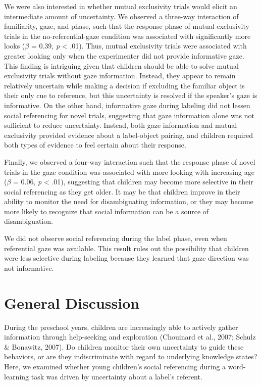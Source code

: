 \documentclass[10pt, letterpaper]{article}
\begin{document}
We were also interested in whether mutual exclusivity trials would
elicit an intermediate amount of uncertainty. We observed a three-way
interaction of familiarity, gaze, and phase, such that the response
phase of mutual exclusivity trials in the no-referential-gaze condition
was associated with significantly more looks (\(\beta\) = 0.39, \emph{p}
\textless{} .01). Thus, mutual exclusivity trials were associated with
greater looking only when the experimenter did not provide informative
gaze. This finding is intriguing given that children should be able to
solve mutual exclusivity trials without gaze information. Instead, they
appear to remain relatively uncertain while making a decision if
excluding the familiar object is their only cue to reference, but this
uncertainty is resolved if the speaker's gaze is informative. On the
other hand, informative gaze during labeling did not lessen social
referencing for novel trials, suggesting that gaze information alone was
not sufficient to reduce uncertainty. Instead, both gaze information and
mutual exclusivity provided evidence about a label-object pairing, and
children required both types of evidence to feel certain about their
response.

Finally, we observed a four-way interaction such that the response phase
of novel trials in the gaze condition was associated with more looking
with increasing age (\(\beta\) = 0.06, \emph{p} \textless{} .01),
suggesting that children may become more selective in their social
referencing as they get older. It may be that children improve in their
ability to monitor the need for disambiguating information, or they may
become more likely to recognize that social information can be a source
of disambiguation.

We did not observe social referencing during the label phase, even when
referential gaze was available. This result rules out the possibility
that children were less selective during labeling because they learned
that gaze direction was not informative.

\section{General Discussion}\label{general-discussion}

During the preschool years, children are increasingly able to actively
gather information through help-seeking and exploration (Chouinard et
al., 2007; Schulz \& Bonawitz, 2007). Do children monitor their own
uncertainty to guide these behaviors, or are they indiscriminate with
regard to underlying knowledge states? Here, we examined whether young
children's social referencing during a word-learning task was driven by
uncertainty about a label's referent.
\end{document}
